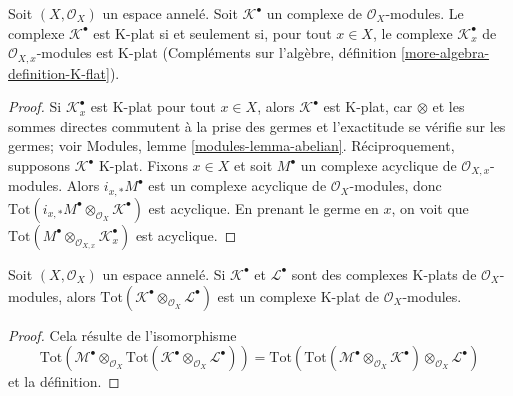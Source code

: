 \begin{lemma}

\label{lemma-check-K-flat-stalks}

Soit $(X, \mathcal{O}_X)$ un espace annelé. Soit $\mathcal{K}^\bullet$
un complexe de $\mathcal{O}_X$-modules. Le complexe $\mathcal{K}^\bullet$
est K-plat si et seulement si, pour tout $x \in X$, le complexe
$\mathcal{K}_x^\bullet$ de $\mathcal{O}_{X, x}$-modules est K-plat (Compléments sur l'algèbre, définition \ref{more-algebra-definition-K-flat}).

\end{lemma}

\begin{proof}

Si $\mathcal{K}_x^\bullet$ est K-plat pour tout $x \in X$, alors $\mathcal{K}^\bullet$ est K-plat, car $\otimes$ et les sommes directes commutent à la prise des germes et l'exactitude se vérifie sur les germes; voir Modules, lemme \ref{modules-lemma-abelian}. Réciproquement, supposons $\mathcal{K}^\bullet$ K-plat. Fixons $x \in X$
et soit
$M^\bullet$ un complexe acyclique de $\mathcal{O}_{X, x}$-modules. Alors $i_{x, *}M^\bullet$ est un complexe acyclique de $\mathcal{O}_X$-modules, donc $\text{Tot}(i_{x, *}M^\bullet \otimes_{\mathcal{O}_X} \mathcal{K}^\bullet)$
est acyclique. En prenant le germe en $x$, on voit que
$\text{Tot}(M^\bullet \otimes_{\mathcal{O}_{X, x}} \mathcal{K}_x^\bullet)$
est acyclique.

\end{proof}

\begin{lemma}

\label{lemma-tensor-product-K-flat}

Soit $(X, \mathcal{O}_X)$ un espace annelé. Si $\mathcal{K}^\bullet$ et $\mathcal{L}^\bullet$ sont des complexes K-plats de $\mathcal{O}_X$-modules, alors
$\text{Tot}(\mathcal{K}^\bullet \otimes_{\mathcal{O}_X} \mathcal{L}^\bullet)$
est un complexe K-plat de $\mathcal{O}_X$-modules.

\end{lemma}

\begin{proof}

Cela résulte de l'isomorphisme
$$
\text{Tot}(\mathcal{M}^\bullet \otimes_{\mathcal{O}_X}
\text{Tot}(\mathcal{K}^\bullet \otimes_{\mathcal{O}_X} \mathcal{L}^\bullet))
=
\text{Tot}(\text{Tot}(\mathcal{M}^\bullet \otimes_{\mathcal{O}_X}
\mathcal{K}^\bullet) \otimes_{\mathcal{O}_X} \mathcal{L}^\bullet)
$$
et la définition.

\end{proof}

